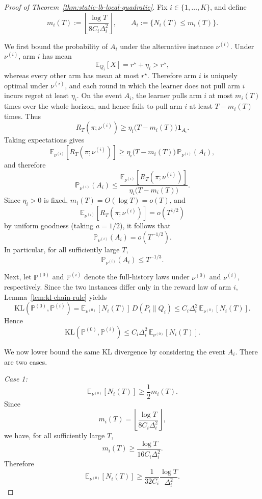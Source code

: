 \documentclass[
  12pt]{article}
\begin{document}
\begin{proof}[Proof of Theorem~\ref{thm:static-lb-local-quadratic}]
Fix $i\in\{1,\dots,K\}$, and define
\[
m_i(T):=\left\lfloor \frac{\log T}{8C_i\Delta_i^2}\right\rfloor,
\qquad
A_i:=\{N_i(T)\le m_i(T)\}.
\]

We first bound the probability of $A_i$ under the alternative instance
$\nu^{(i)}$. Under $\nu^{(i)}$, arm $i$ has mean
\[
\mathbb E_{Q_i}[X]=r^\star+\eta_i>r^\star,
\]
whereas every other arm has mean at most $r^\star$. Therefore arm $i$ is
uniquely optimal under $\nu^{(i)}$, and each round in which the learner does
not pull arm $i$ incurs regret at least $\eta_i$. On the event $A_i$, the
learner pulls arm $i$ at most $m_i(T)$ times over the whole horizon, and hence
fails to pull arm $i$ at least $T-m_i(T)$ times. Thus
\[
R_T(\pi;\nu^{(i)})
\ge
\eta_i\bigl(T-m_i(T)\bigr)\mathbf 1_{A_i}.
\]
Taking expectations gives
\[
\mathbb E_{\nu^{(i)}}[R_T(\pi;\nu^{(i)})]
\ge
\eta_i\bigl(T-m_i(T)\bigr)\,\mathbb P_{\nu^{(i)}}(A_i),
\]
and therefore
\[
\mathbb P_{\nu^{(i)}}(A_i)
\le
\frac{\mathbb E_{\nu^{(i)}}[R_T(\pi;\nu^{(i)})]}
{\eta_i\bigl(T-m_i(T)\bigr)}.
\]
Since $\eta_i>0$ is fixed, $m_i(T)=O(\log T)=o(T)$, and
\[
\mathbb E_{\nu^{(i)}}[R_T(\pi;\nu^{(i)})]=o(T^{1/2})
\]
by uniform goodness (taking $a=1/2$), it follows that
\[
\mathbb P_{\nu^{(i)}}(A_i)=o(T^{-1/2}).
\]
In particular, for all sufficiently large $T$,
\begin{equation}
\mathbb P_{\nu^{(i)}}(A_i)\le T^{-1/3}.
\label{eq:localquad-A1}
\end{equation}

Next, let $\mathbb P^{(0)}$ and $\mathbb P^{(i)}$ denote the full-history laws
under $\nu^{(0)}$ and $\nu^{(i)}$, respectively. Since the two instances
differ only in the reward law of arm $i$, Lemma~\ref{lem:kl-chain-rule} yields
\[
\mathrm{KL}(\mathbb P^{(0)},\mathbb P^{(i)})
=
\mathbb E_{\nu^{(0)}}[N_i(T)]\,D(P_i\|Q_i)
\le
C_i\Delta_i^2\,\mathbb E_{\nu^{(0)}}[N_i(T)].
\]
Hence
\begin{equation}
\mathrm{KL}(\mathbb P^{(0)},\mathbb P^{(i)})
\le
C_i\Delta_i^2\,\mathbb E_{\nu^{(0)}}[N_i(T)].
\label{eq:localquad-A2}
\end{equation}

We now lower bound the same KL divergence by considering the event $A_i$. There
are two cases.

\medskip
\noindent
\textit{Case 1:}
\[
\mathbb E_{\nu^{(0)}}[N_i(T)]\ge \frac12 m_i(T).
\]
Since
\[
m_i(T)=\left\lfloor \frac{\log T}{8C_i\Delta_i^2}\right\rfloor,
\]
we have, for all sufficiently large $T$,
\[
m_i(T)\ge \frac{\log T}{16C_i\Delta_i^2}.
\]
Therefore
\[
\mathbb E_{\nu^{(0)}}[N_i(T)]
\ge
\frac{1}{32C_i}\frac{\log T}{\Delta_i^2}.
\]


\end{proof}
\end{document}
